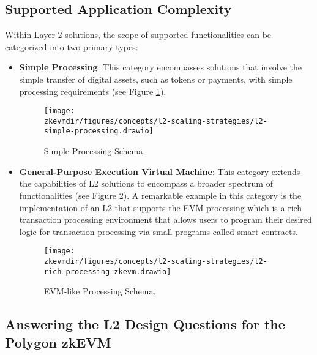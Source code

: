 \subsection{Supported Application Complexity}

Within Layer 2 solutions, the scope of supported functionalities can be categorized into two primary types:

\begin{itemize}

\item \textbf{Simple Processing}: This category encompasses solutions that involve the simple transfer of digital assets, such as tokens or payments, with simple processing requirements (see Figure \ref{fig:simple-processing}).

\begin{figure}[h!]
\centering
\texttt{[image: \\zkevmdir/figures/concepts/l2-scaling-strategies/l2-simple-processing.drawio]}
\caption{Simple Processing Schema.}
\label{fig:simple-processing}
\end{figure}

\item \textbf{General-Purpose Execution Virtual Machine}: This category extends the capabilities of L2 solutions to encompass a broader spectrum of functionalities (see Figure \ref{fig:rich-processing}).
A remarkable example in this category is the implementation of an L2 that supports the EVM processing
which is a rich transaction processing environment that allows users to program their desired 
logic for transaction processing via small programs called smart contracts.

\begin{figure}[h!]
\centering
\texttt{[image: \\zkevmdir/figures/concepts/l2-scaling-strategies/l2-rich-processing-zkevm.drawio]}
\caption{EVM-like Processing Schema.}
\label{fig:rich-processing}
\end{figure}

\end{itemize}


\subsection{Answering the L2 Design Questions for the Polygon zkEVM}

